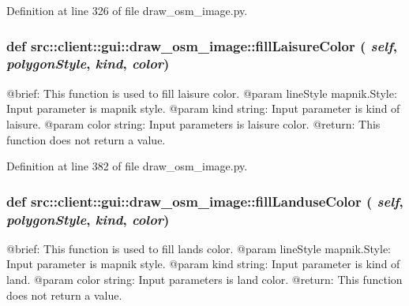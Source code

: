 Definition at line 326 of file draw\_\-osm\_\-image.py.

\hypertarget{namespacesrc_1_1client_1_1gui_1_1draw__osm__image_aa8b01a59a1def18c55385f2e70cc2053}{
\subsubsection[{fillLaisureColor}]{\setlength{\rightskip}{0pt plus 5cm}def src::client::gui::draw\_\-osm\_\-image::fillLaisureColor ( {\em self}, \/   {\em polygonStyle}, \/   {\em kind}, \/   {\em color})}}
\label{namespacesrc_1_1client_1_1gui_1_1draw__osm__image_aa8b01a59a1def18c55385f2e70cc2053}
\begin{DoxyVerb}
@brief: This function is used to fill laisure color.
@param lineStyle mapnik.Style: Input parameter is mapnik style.
@param kind string: Input parameter is kind of laisure.
@param color string: Input parameters is laisure color. 
@return: This function does not return a value.
\end{DoxyVerb}
 

Definition at line 382 of file draw\_\-osm\_\-image.py.

\hypertarget{namespacesrc_1_1client_1_1gui_1_1draw__osm__image_a007aa2a3bd992ff47df638d2b152c8d1}{
\subsubsection[{fillLanduseColor}]{\setlength{\rightskip}{0pt plus 5cm}def src::client::gui::draw\_\-osm\_\-image::fillLanduseColor ( {\em self}, \/   {\em polygonStyle}, \/   {\em kind}, \/   {\em color})}}
\label{namespacesrc_1_1client_1_1gui_1_1draw__osm__image_a007aa2a3bd992ff47df638d2b152c8d1}
\begin{DoxyVerb}
@brief: This function is used to fill lands color.
@param lineStyle mapnik.Style: Input parameter is mapnik style.
@param kind string: Input parameter is kind of land.
@param color string: Input parameters is land color. 
@return: This function does not return a value.
\end{DoxyVerb}
 

